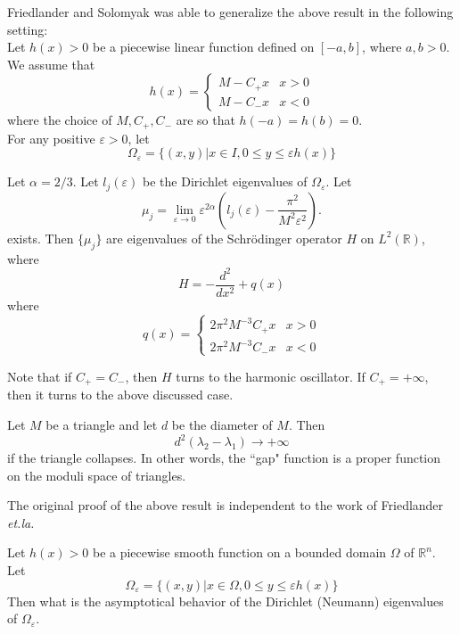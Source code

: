 Friedlander and Solomyak was able to generalize the above result in the 
following setting:
\\

Let $h(x) > 0$ be a piecewise linear function defined on $[-a, b]$, where
$a, b > 0$. We assume that
\[
h(x) = \left\{
\begin{array}{ll}
M-C_+x & x > 0 \\
M-C_-x & x < 0
\end{array}
\right.
\]
where the choice of $M, C_+, C_-$ are so that $h(-a) = h(b) = 0$.
\\

For any positive $\varepsilon > 0$, let
\[
\Omega_\varepsilon = \{(x,y)|x\in I, 0\leqslant y \leqslant \varepsilon h(x)\}
\]
\begin{theorem}
 Let $\alpha = 2/3$. Let $l_j(\varepsilon)$ be the
Dirichlet eigenvalues of $\Omega_\varepsilon$. Let
\[
\mu_j = \lim_{\varepsilon\rightarrow 0}
\varepsilon^{2\alpha}
\left(l_j(\varepsilon) - \frac{\pi^2}{M^2\varepsilon^2}\right).
\]
exists. Then $\{\mu_j\}$ are eigenvalues of the Schr\"{o}dinger operator $H$ on
$L^2(\mathbb{R})$, where
\[
H = -\frac{d^2}{dx^2} + q(x)
\]
where
\[
q(x) = \left\{
\begin{array}{ll}
2\pi^2 M^{-3} C_+x & x > 0 \\
2\pi^2 M^{-3} C_-x & x < 0
\end{array}
\right.
\]
\end{theorem}

Note that if $C_+ = C_-$, then $H$ turns to the harmonic oscillator. If
$C_+ = +\infty$, then it turns to the above discussed case.

\begin{theorem}
[Lu-Rowlett] Let $M$ be a triangle and let $d$ be the diameter of $M$. Then
\[
d^2(\lambda_2 - \lambda_1) \rightarrow +\infty
\]
if the triangle collapses. In other words, the ``gap" function is a proper
function on the moduli space of triangles.
\end{theorem}

The original proof of the above result is independent to the work of Friedlander
\textit{et.la.}
\\

\begin{question} Let $h(x) > 0$ be a piecewise smooth function on a bounded
domain $\Omega$ of $\mathbb{R}^n$. Let
\[
\Omega_\varepsilon = \{(x,y)|x\in\Omega, 0\leqslant y\leqslant\varepsilon h(x)\}
\]
Then what is the asymptotical behavior of the Dirichlet (Neumann) eigenvalues of
$\Omega_\varepsilon$.
\end{question}

